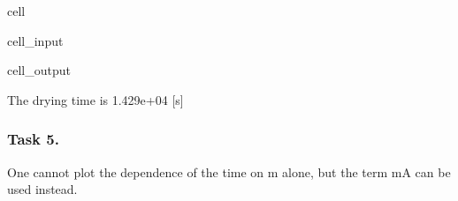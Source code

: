 \documentclass[letterpaper,10pt,english]{jupyterBook}
\begin{document}
\begin{sphinxuseclass}{cell}
\begin{sphinxVerbatimInput}
\begin{sphinxuseclass}{cell_input}
\end{sphinxuseclass}\end{sphinxVerbatimInput}
\begin{sphinxVerbatimOutput}

\begin{sphinxuseclass}{cell_output}
\begin{sphinxVerbatim}[commandchars=\\\{\}]
The drying time is 1.429e+04 [s]
\end{sphinxVerbatim}

\end{sphinxuseclass}\end{sphinxVerbatimOutput}

\end{sphinxuseclass}

\subsubsection{Task 5.}
\label{\detokenize{Exercise_W10_2021:task-5}}
\sphinxAtStartPar
One cannot plot the dependence of the time on m alone, but the term mA can be used instead.
\end{document}
